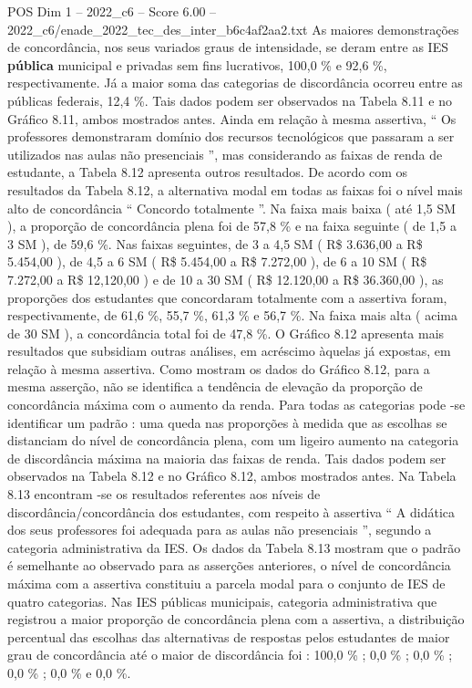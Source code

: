 \begin{textsample}{POS Dim 1 – 2022\_c6 – Score 6.00 – 2022\_c6/enade\_2022\_tec\_des\_inter\_b6c4af2aa2.txt}
As maiores demonstrações de concordância, nos seus variados graus de intensidade, se deram entre as IES \textbf{pública} municipal e privadas sem fins lucrativos, 100,0 \% e 92,6 \%, respectivamente.
Já a maior soma das categorias de discordância ocorreu entre as públicas federais, 12,4 \%.
Tais dados podem ser observados na Tabela 8.11 e no Gráfico 8.11, ambos mostrados antes.
Ainda em relação à mesma assertiva, “ Os professores demonstraram domínio dos recursos tecnológicos que passaram a ser utilizados nas aulas não presenciais ”, mas considerando as faixas de renda de estudante, a Tabela 8.12 apresenta outros resultados.
De acordo com os resultados da Tabela 8.12, a alternativa modal em todas as faixas foi o nível mais alto de concordância “ Concordo totalmente ”.
Na faixa mais baixa ( até 1,5 SM ), a proporção de concordância plena foi de 57,8 \% e na faixa seguinte ( de 1,5 a 3 SM ), de 59,6 \%.
Nas faixas seguintes, de 3 a 4,5 SM ( R\$ 3.636,00 a R\$ 5.454,00 ), de 4,5 a 6 SM ( R\$ 5.454,00 a R\$ 7.272,00 ), de 6 a 10 SM ( R\$ 7.272,00 a R\$ 12,120,00 ) e de 10 a 30 SM ( R\$ 12.120,00 a R\$ 36.360,00 ), as proporções dos estudantes que concordaram totalmente com a assertiva foram, respectivamente, de 61,6 \%, 55,7 \%, 61,3 \% e 56,7 \%.
Na faixa mais alta ( acima de 30 SM ), a concordância total foi de 47,8 \%.
O Gráfico 8.12 apresenta mais resultados que subsidiam outras análises, em acréscimo àquelas já expostas, em relação à mesma assertiva.
Como mostram os dados do Gráfico 8.12, para a mesma asserção, não se identifica a tendência de elevação da proporção de concordância máxima com o aumento da renda.
Para todas as categorias pode -se identificar um padrão : uma queda nas proporções à medida que as escolhas se distanciam do nível de concordância plena, com um ligeiro aumento na categoria de discordância máxima na maioria das faixas de renda.
Tais dados podem ser observados na Tabela 8.12 e no Gráfico 8.12, ambos mostrados antes.
Na Tabela 8.13 encontram -se os resultados referentes aos níveis de discordância/concordância dos estudantes, com respeito à assertiva “ A didática dos seus professores foi adequada para as aulas não presenciais ”, segundo a categoria administrativa da IES.
Os dados da Tabela 8.13 mostram que o padrão é semelhante ao observado para as asserções anteriores, o nível de concordância máxima com a assertiva constituiu a parcela modal para o conjunto de IES de quatro categorias.
Nas IES públicas municipais, categoria administrativa que registrou a maior proporção de concordância plena com a assertiva, a distribuição percentual das escolhas das alternativas de respostas pelos estudantes de maior grau de concordância até o maior de discordância foi : 100,0 \% ; 0,0 \% ; 0,0 \% ; 0,0 \% ; 0,0 \% e 0,0 \%.

\end{textsample}
